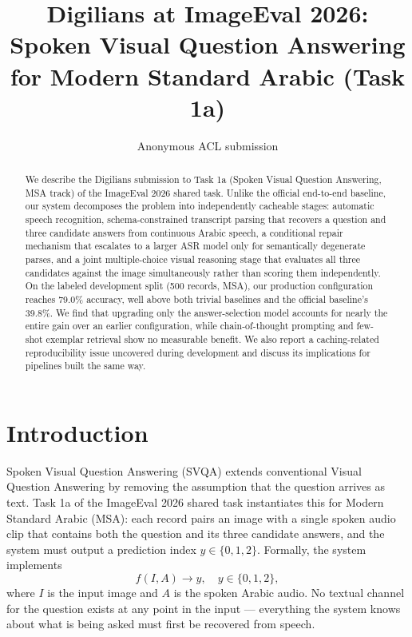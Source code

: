 \documentclass[11pt]{article}
\title{Digilians at ImageEval 2026: Spoken Visual Question Answering for Modern Standard Arabic (Task 1a)}
\author{Anonymous ACL submission}
\begin{document}
\maketitle

\begin{abstract}
We describe the Digilians submission to Task 1a (Spoken Visual Question Answering, MSA track) of the ImageEval 2026 shared task. Unlike the official end-to-end baseline, our system decomposes the problem into independently cacheable stages: automatic speech recognition, schema-constrained transcript parsing that recovers a question and three candidate answers from continuous Arabic speech, a conditional repair mechanism that escalates to a larger ASR model only for semantically degenerate parses, and a joint multiple-choice visual reasoning stage that evaluates all three candidates against the image simultaneously rather than scoring them independently. On the labeled development split (500 records, MSA), our production configuration reaches 79.0\% accuracy, well above both trivial baselines and the official baseline's 39.8\%. We find that upgrading only the answer-selection model accounts for nearly the entire gain over an earlier configuration, while chain-of-thought prompting and few-shot exemplar retrieval show no measurable benefit. We also report a caching-related reproducibility issue uncovered during development and discuss its implications for pipelines built the same way.
\end{abstract}

\section{Introduction}
\label{sec:intro}

Spoken Visual Question Answering (SVQA) extends conventional Visual Question Answering by removing the assumption that the question arrives as text. Task 1a of the ImageEval 2026 shared task \citep{imageeval2026task1a} instantiates this for Modern Standard Arabic (MSA): each record pairs an image with a single spoken audio clip that contains both the question and its three candidate answers, and the system must output a prediction index $y \in \{0,1,2\}$. Formally, the system implements
\begin{equation}
  \label{eq:task}
  f(I, A) \rightarrow y, \quad y \in \{0,1,2\},
\end{equation}
where $I$ is the input image and $A$ is the spoken Arabic audio. No textual channel for the question exists at any point in the input --- everything the system knows about what is being asked must first be recovered from speech.
\end{document}
